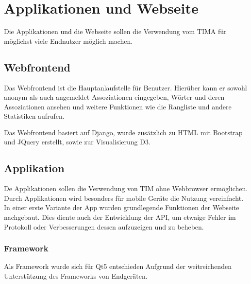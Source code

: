 \chapter{Applikationen und Webseite}
Die Applikationen und die Webseite sollen die Verwendung vom TIMA für möglichst
viele Endnutzer möglich machen.

\section{Webfrontend}
Das Webfrontend ist die Hauptanlaufstelle für Benutzer. Hierüber kann er sowohl anonym als auch angemeldet Assoziationen eingegeben, Wörter und
deren Assoziationen ansehen und weitere Funktionen wie die Rangliste und andere Statistiken aufrufen.

Das Webfrontend basiert auf Django, wurde zusätzlich zu HTML mit Bootstrap und JQuery erstellt, sowie zur Visualisierung D3.

\section{Applikation}
De Applikationen sollen die Verwendung von TIM ohne Webbrowser ermöglichen. Durch Applikationen wird besonders für mobile Geräte die Nutzung
vereinfacht.
In einer erste Variante der App wurden grundlegende Funktionen der
Webseite nachgebaut.  Dies diente auch der Entwicklung der API, um etwaige
Fehler im Protokoll oder Verbesserungen dessen aufzuzeigen und zu beheben.

\subsection{Framework}
Als Framework wurde sich für Qt5 entschieden Aufgrund der weitreichenden
Unterstützung des Frameworks von Endgeräten.


